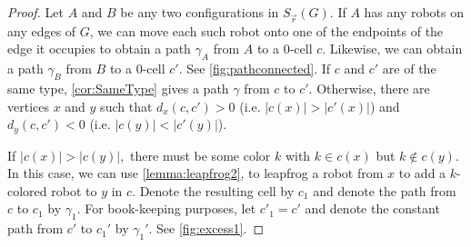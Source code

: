 \documentclass{amsart}
\newcommand{\Sr}{S_{\vec{r}}}
\theoremstyle{definition}
\theoremstyle{remark}
\begin{document}
\begin{proof}
    Let $A$ and $B$ be any two configurations in $\Sr(G)$. If $A$ has any robots on any edges of $G$, we can move each such robot onto one of the endpoints of the edge it occupies to obtain a path $\gamma_{A}$ from $A$ to a $0$-cell $c.$ Likewise, we can obtain a path $\gamma_B$ from $B$ to a 0-cell $c'$. See \cref{fig:pathconnected}. If $c$ and $c'$ are of the same type, \cref{cor:SameType} gives a path $\gamma$ from $c$ to $c'.$ Otherwise, there are vertices $x$ and $y$ such that $d_x(c,c')>0$ (i.e. $|c(x)|>|c'(x)|$) and $d_y(c,c')<0$ (i.e. $|c(y)|<|c'(y)|$). 
    
    If $|c(x)|>|c(y)|,$ there must be some color $k$ with $k\in c(x)$ but $k\notin c(y).$ In this case, we can use \cref{lemma:leapfrog2}, to leapfrog a robot from $x$ to add a $k$-colored robot to $y$ in $c.$ Denote the resulting cell by $c_1$ and denote the path from $c$ to $c_1$ by $\gamma_1$. For book-keeping purposes, let $c'_1=c'$ and denote the constant path from $c'$ to $c_1'$ by $\gamma_1'.$ See \cref{fig:excess1}.


\end{proof}
\end{document}
